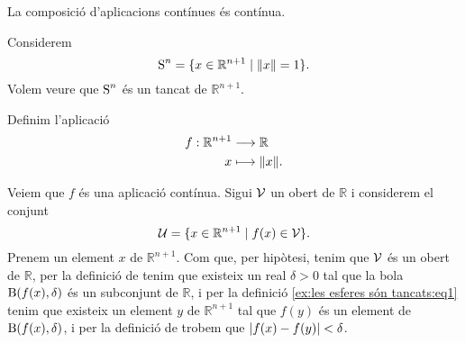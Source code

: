 \documentclass[../Apunts.tex]{subfiles}
\begin{document}
	\begin{observation}
		\label{obs:la composició d'aplicacions contínues és contínua}
		La composició d'aplicacions contínues és contínua.
	\end{observation}
	\begin{example}
		\label{ex:les esferes són tancats}
		Considerem
		\[\esfera^{n}=\{x\in\mathbb{R}^{n+1}\mid\norm{x}=1\}.\]
		Volem veure que \(\operatorname{S}^{n}\) és un tancat de \(\mathbb{R}^{n+1}\).
		\begin{solution}
			Definim l'aplicació
			\begin{align*}
				f:\mathbb{R}^{n+1}&\longrightarrow\mathbb{R} \\
				x&\longmapsto\norm{x}.
			\end{align*}
			\begin{comment}
				Veiem que \(f\) és una aplicació tancada. Sigui \(\tancat{C}\) un tancat de \(\mathbb{R}^{n+1}\) i considerem el conjunt
				\[\tancat{K}=\{f(x)\in\mathbb{R}\mid x\in\tancat{C}\}.\]
				Tenim que \(\tancat{K}\) és un tancat de \(\mathbb{R}\), ja que si \(y\) és un element de \(\tancat{K}\), aleshores \(y\neq f(x)\) per a tot \(x\) de \(\obert{C}\), i per tant existeix un real \(d>0\) tal que
				\[d=\min_{x\in\tancat{C}}\abs{f(x)-y},\]
				i per tant tenim que per a tot \(y\) de \(\mathbb{R}\setminus\tancat{K}\) existeix una bola \(\bola(y,d)\) tal que \(\bola(y,d)\cap\tancat{K}=\emptyset\), i per la definició d'\myref{def:obert espai mètric} trobem que \(\mathbb{R}\setminus\tancat{K}\) és un obert de \(\mathbb{R}\). Aleshores per la definició de \myref{def:tancat} trobem que \(\tancat{K}\) és un tancat, i per la definició de \myref{def:aplicació tancada} trobem que \(f\) és una aplicació tancada.
				
				Ara bé, tenim que \(\{1\}\) és un tancat de \(\mathbb{R}\)
			\end{comment}
			Veiem que \(f\) és una aplicació contínua. Sigui \(\mathcal{V}\) un obert de \(\mathbb{R}\) i considerem el conjunt
			\begin{equation}
				\label{ex:les esferes són tancats:eq1}
				\mathcal{U}=\{x\in\mathbb{R}^{n+1}\mid f(x)\in\mathcal{V}\}.
			\end{equation}
			Prenem un element \(x\) de \(\mathbb{R}^{n+1}\). Com que, per hipòtesi, tenim que \(\mathcal{V}\) és un obert de \(\mathbb{R}\), per la definició de  tenim que existeix un real \(\delta>0\) tal que la bola \(\operatorname{B}(f(x),\delta)\) és un subconjunt de \(\mathbb{R}\), i per la definició \eqref{ex:les esferes són tancats:eq1} tenim que existeix un element \(y\) de \(\mathbb{R}^{n+1}\) tal que \(f(y)\) és un element de \(\operatorname{B}(f(x),\delta)\), i per la definició de  trobem que \(\abs{f(x)-f(y)}<\delta\).
		\end{solution}
	\end{example}
\end{document}
